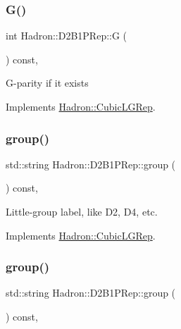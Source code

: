 \subsubsection{\texorpdfstring{G()}{G()}\hspace{0.1cm}{\footnotesize\ttfamily [2/2]}}
{\footnotesize\ttfamily int Hadron\+::\+D2\+B1\+P\+Rep\+::G (\begin{DoxyParamCaption}{ }\end{DoxyParamCaption}) const\hspace{0.3cm}{\ttfamily [inline]}, {\ttfamily [virtual]}}

G-\/parity if it exists 

Implements \mbox{\hyperlink{structHadron_1_1CubicLGRep_ace26f7b2d55e3a668a14cb9026da5231}{Hadron\+::\+Cubic\+L\+G\+Rep}}.

\mbox{\label{structHadron_1_1D2B1PRep_ac5e1e2dc68a975d7263f783bbc7f4658}} 
\subsubsection{\texorpdfstring{group()}{group()}\hspace{0.1cm}{\footnotesize\ttfamily [1/2]}}
{\footnotesize\ttfamily std\+::string Hadron\+::\+D2\+B1\+P\+Rep\+::group (\begin{DoxyParamCaption}{ }\end{DoxyParamCaption}) const\hspace{0.3cm}{\ttfamily [inline]}, {\ttfamily [virtual]}}

Little-\/group label, like D2, D4, etc. 

Implements \mbox{\hyperlink{structHadron_1_1CubicLGRep_a9bdb14b519a611d21379ed96a3a9eb41}{Hadron\+::\+Cubic\+L\+G\+Rep}}.

\mbox{\label{structHadron_1_1D2B1PRep_ac5e1e2dc68a975d7263f783bbc7f4658}} 
\subsubsection{\texorpdfstring{group()}{group()}\hspace{0.1cm}{\footnotesize\ttfamily [2/2]}}
{\footnotesize\ttfamily std\+::string Hadron\+::\+D2\+B1\+P\+Rep\+::group (\begin{DoxyParamCaption}{ }\end{DoxyParamCaption}) const\hspace{0.3cm}{\ttfamily [inline]}, {\ttfamily [virtual]}}

